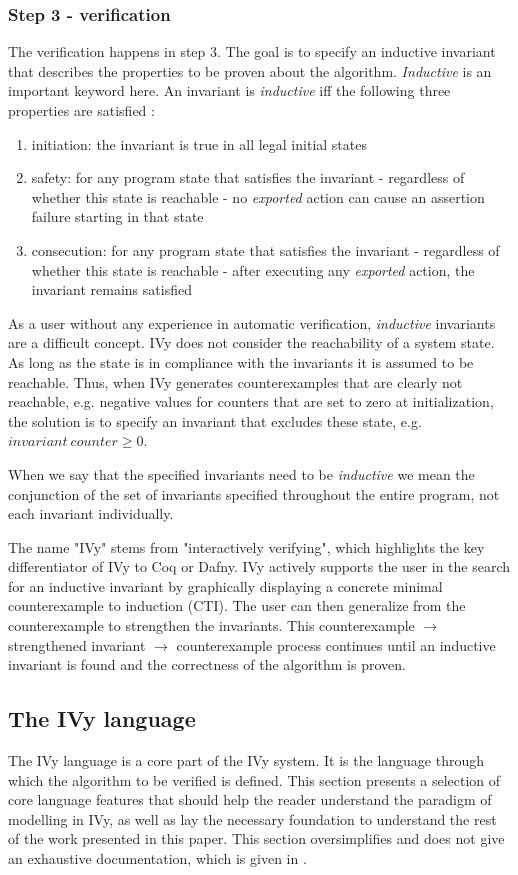 \documentclass[fleqn]{article}
\begin{document}
\subsubsection{Step 3 - verification}
The verification happens in step 3. The goal is to specify an inductive invariant that describes the properties to be proven about the algorithm. \textit{Inductive} is an important
keyword here. An invariant is \textit{inductive} iff the following three properties are satisfied \cite{invariants}:
\begin{enumerate}
  \item initiation: the invariant is true in all legal initial states
  \item safety: for any program state that satisfies the invariant - regardless of whether this state is reachable - no \textit{exported} action can cause an assertion failure starting in that state
  \item consecution: for any program state that satisfies the invariant - regardless of whether this state is reachable - after executing any \textit{exported} action, the invariant remains satisfied
\end{enumerate}
As a user without any experience in automatic verification, \textit{inductive} invariants are a difficult concept.
IVy does not consider the reachability of a system state.  As long as the state is in compliance with the invariants it is assumed to be reachable.
Thus, when IVy generates counterexamples that are clearly not reachable, e.g. negative values for counters that are set to zero at initialization,
the solution is to specify an invariant that excludes these state, e.g. $invariant\ counter \geq 0$.

When we say that the specified invariants need to be \textit{inductive} we mean the conjunction of the set of invariants specified throughout the entire program,
not each invariant individually.

The name "IVy" stems from "interactively verifying", which highlights the key differentiator of IVy to Coq or Dafny.\cite{ivy}
IVy actively supports the user in the search for an inductive invariant by graphically displaying a concrete minimal counterexample to induction (CTI).
The user can then generalize from the counterexample to strengthen the invariants. This counterexample $\rightarrow$ strengthened invariant $\rightarrow$ counterexample process continues
until an inductive invariant is found and the correctness of the algorithm is proven.

\subsection{The IVy language}
The IVy language is a core part of the IVy system. It is the language through which the algorithm to be verified is defined.
This section presents a selection of core language features that should help the reader understand the paradigm of modelling in IVy, as well as lay the necessary foundation to understand
the rest of the work presented in this paper. This section oversimplifies and does not give an exhaustive documentation, which is given in \cite{refLanguageDoc}.
\end{document}
